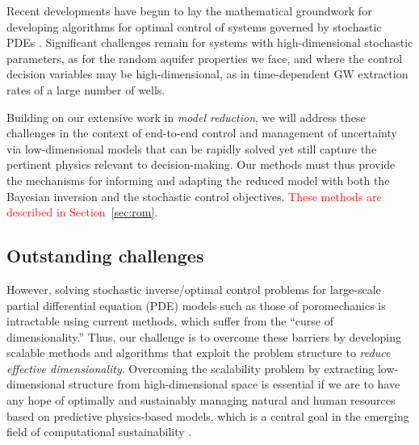 \documentclass[11pt,final]{article}%
\newcommand{\note}[1]{\textcolor{red}{ #1}}
\begin{document}
Recent developments have begun to lay the mathematical groundwork for developing algorithms for optimal control of systems governed by stochastic PDEs \cite{GunzburgerLeeLee11,GunzburgerMing11,Kouri12}. Significant challenges remain for systems with high-dimensional stochastic parameters, as for the random aquifer properties we face, and where the control decision variables may be high-dimensional, as in time-dependent GW extraction rates of a large number of wells.

Building on our extensive work in {\em model reduction}, we will address these challenges in the context of end-to-end control and management of uncertainty via low-dimensional models that can be rapidly solved yet still capture the pertinent physics relevant to decision-making. Our methods must thus provide the mechanisms for informing and adapting the reduced model with both the Bayesian inversion and the stochastic control objectives. \note{These methods are described in Section~\ref{sec:rom}.}



\subsection{Outstanding challenges}\label{sec:challenges}
However, solving stochastic inverse/optimal control problems for large-scale partial differential equation (PDE) models such as those of poromechanics is intractable using current methods, which suffer from the ``curse of dimensionality.''  Thus, our challenge is to overcome these barriers by developing scalable methods and algorithms that exploit the problem structure to {\em reduce effective dimensionality}. Overcoming the scalability problem by extracting low-dimensional structure from high-dimensional space is essential if we are to have any hope of optimally and sustainably managing natural and human resources based on predictive physics-based models, which is a central goal in the emerging field of computational
sustainability \cite{NRC2012}.
\end{document}
